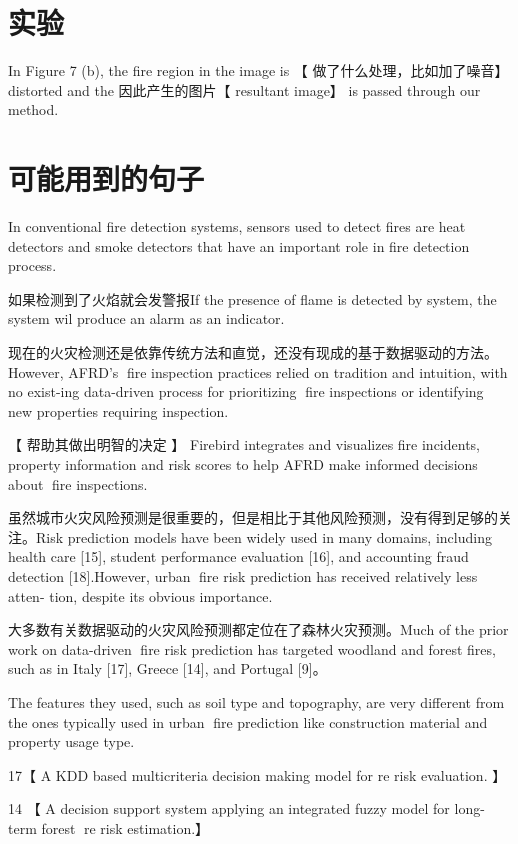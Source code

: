\documentclass[UTF8]{ctexart}
\begin{document}
	\section{实验}
	In Figure 7 (b),
	the fire region in the image is 【 做了什么处理，比如加了噪音】 distorted and the 因此产生的图片【 resultant image】
	is passed through our method.
		
		
	\section{可能用到的句子}
	In conventional fire
	detection systems, sensors used to detect fires are heat
	detectors and smoke detectors that have an important role in
	fire detection process.\cite{Riyadi_2018}
	
	
	
	如果检测到了火焰就会发警报If the presence of flame is detected by system, the
	system wil produce an alarm as an indicator.
	
	现在的火灾检测还是依靠传统方法和直觉，还没有现成的基于数据驱动的方法。However, AFRD's fire inspection practices relied on tradition and intuition, with no exist-ing data-driven process for prioritizing fire inspections or
	identifying new properties requiring inspection. \cite{madaio_firebird:_2016}
	
	【 帮助其做出明智的决定 】 Firebird integrates and visualizes fire incidents, property information and risk scores to help AFRD make informed decisions about fire inspections.
	
	虽然城市火灾风险预测是很重要的，但是相比于其他风险预测，没有得到足够的关注。Risk prediction models have been widely used in many domains, including health care [15], student performance evaluation [16], and accounting fraud detection [18].However, urban fire risk prediction has received relatively less atten-
	tion, despite its obvious importance.
	
	大多数有关数据驱动的火灾风险预测都定位在了森林火灾预测。Much of the prior work on data-driven fire risk prediction has targeted woodland and forest fires, such as in Italy  [17], Greece [14], and Portugal [9]。

	The features they used, such as soil type and topography, are very different from the ones typically used in urban fire prediction like
	construction material and property usage type.
	
	17【 A  KDD based multicriteria decision making model for
	re risk evaluation. 】
	
	14 【 A decision support system applying an
	integrated fuzzy model for long-term forest re risk
	estimation.】 
	
\end{document}
